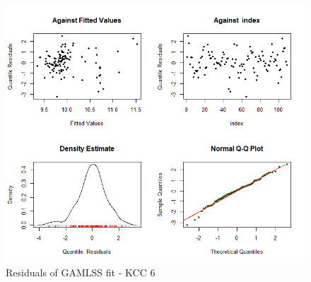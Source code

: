 \begin{figure}[H]
\centering
  \includegraphics[width=0.95\linewidth]{figures/gamlss_residuals_kcc_6.png}
  \caption{Residuals of GAMLSS fit - KCC 6}
  \label{fig:gamlss_residuals_kcc_6}
\end{figure}


















